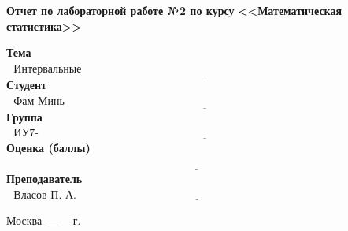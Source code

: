 \begin{titlepage}
	\begin{center}
		\noindent\begin{minipage}{1.3\textwidth}\centering
		\Large\textbf{Отчет по лабораторной работе №2 по курсу}\newline
		\textbf{<<Математическая статистика>>}\newline\newline\newline
		\end{minipage}
	\end{center}
	

	\noindent\textbf{Тема}           $\underline{\text{~~Интервальные оценки~~~~~~~~~~~~~~~~~~~~~~~~~~~~~~~~~~~~~~~~~~~~~~~~~~~~~~~~~~~~~~~~~~~~~~~~~~~~~~~~~~~~~~~~}}$\newline\newline
	\noindent\textbf{Студент}        $\underline{\text{~~Фам Минь Хиеу~~~~~~~~~~~~~~~~~~~~~~~~~~~~~~~~~~~~~~~~~~~~~~~~~~~~~~~~~~~~~~~~~~~~~~~~~~~~~~~~~~~~~~~~~~~~~~~}}$\newline\newline
	\noindent\textbf{Группа}         $\underline{\text{~~ИУ7-62Б~~~~~~~~~~~~~~~~~~~~~~~~~~~~~~~~~~~~~~~~~~~~~~~~~~~~~~~~~~~~~~~~~~~~~~~~~~~~~~~~~~~~~~~~~~~~~~~~~~~~~~}}$\newline\newline
	\noindent\textbf{Оценка (баллы)} $\underline{\text{~~~~~~~~~~~~~~~~~~~~~~~~~~~~~~~~~~~~~~~~~~~~~~~~~~~~~~~~~~~~~~~~~~~~~~~~~~~~~~~~~~~~~~~~~~~~~~~~~~~~~~~~}}$\newline\newline
	\noindent\textbf{Преподаватель}  $\underline{\text{~~Власов П. А.~~~~~~~~~~~~~~~~~~~~~~~~~~~~~~~~~~~~~~~~~~~~~~~~~~~~~~~~~~~~~~~~~~~~~~~~~~~~~~~~~~~~~}}$\newline	
	\begin{center}
		\vfill
		Москва~---~\the\year
		~г.
	\end{center}
	\restoregeometry
\end{titlepage}

